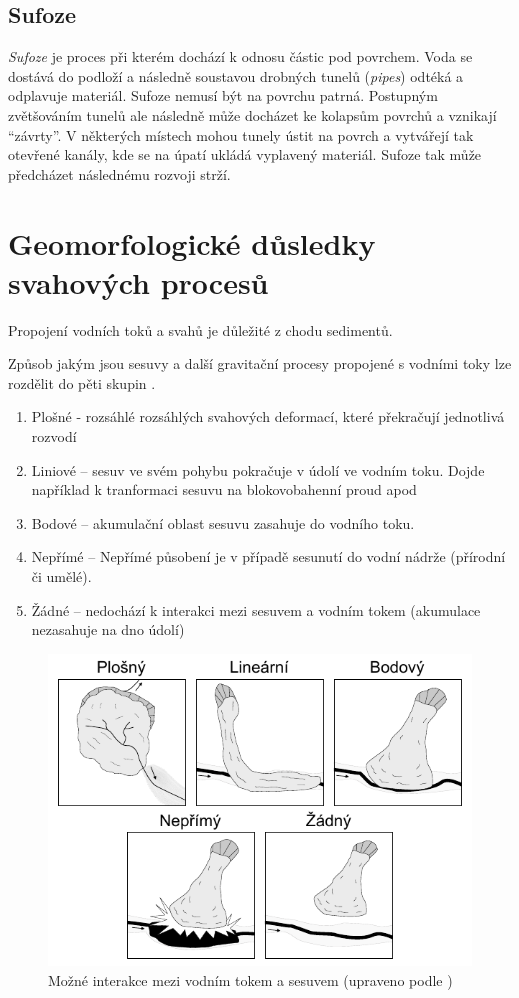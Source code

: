 \subsection{Sufoze}
\emph{Sufoze} je proces při kterém dochází k odnosu částic pod povrchem. Voda se dostává do podloží a následně soustavou drobných tunelů (\textit{pipes}) odtéká a odplavuje materiál. Sufoze nemusí být na povrchu patrná. Postupným zvětšováním tunelů ale následně může docházet ke kolapsům povrchů a vznikají \enquote{závrty}. V některých místech mohou tunely ústit na povrch a vytvářejí tak otevřené kanály, kde se na úpatí ukládá vyplavený materiál. Sufoze tak může předcházet následnému rozvoji strží. 

\section{Geomorfologické důsledky svahových procesů}
Propojení vodních toků a svahů je důležité z chodu sedimentů. 


Způsob jakým jsou sesuvy a další gravitační procesy propojené s vodními toky lze rozdělit do pěti skupin \parencite{korupGeomorphicImprintLandslides2005}. 

\begin{enumerate}
	\item Plošné - rozsáhlé rozsáhlých svahových deformací, které překračují jednotlivá rozvodí
	\item Liniové -- sesuv ve svém pohybu pokračuje v údolí ve vodním toku. Dojde například k tranformaci sesuvu na blokovobahenní proud apod
	\item Bodové -- akumulační oblast sesuvu zasahuje do vodního toku.
	\item Nepřímé -- Nepřímé působení je v případě sesunutí do vodní nádrže (přírodní či umělé).
	\item Žádné -- nedochází k interakci mezi sesuvem a vodním tokem (akumulace nezasahuje na dno údolí)
\end{enumerate}

\begin{figure}[h]
	\centering
	\includegraphics[width=1\linewidth]{obrazky/slope/korup_toky}
	\caption{Možné interakce mezi vodním tokem a sesuvem (upraveno podle \textcite{korupGeomorphicImprintLandslides2005})}
	\label{fig:koruptoky}
\end{figure}



